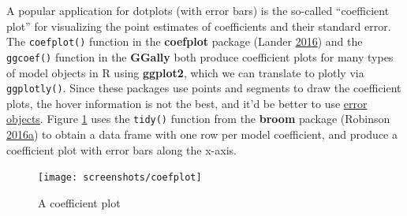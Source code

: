 \documentclass[12pt,]{isuthesis}
\newenvironment{Shaded}{\begin{snugshade}}{\end{snugshade}}
\newcommand{\KeywordTok}[1]{\textcolor[rgb]{0.13,0.29,0.53}{\textbf{{#1}}}}
\newcommand{\DataTypeTok}[1]{\textcolor[rgb]{0.13,0.29,0.53}{{#1}}}
\newcommand{\DecValTok}[1]{\textcolor[rgb]{0.00,0.00,0.81}{{#1}}}
\newcommand{\StringTok}[1]{\textcolor[rgb]{0.31,0.60,0.02}{{#1}}}
\newcommand{\CommentTok}[1]{\textcolor[rgb]{0.56,0.35,0.01}{\textit{{#1}}}}
\newcommand{\NormalTok}[1]{{#1}}
\begin{document}
A popular application for dotplots (with error bars) is the so-called
``coefficient plot'' for visualizing the point estimates of coefficients
and their standard error. The \texttt{coefplot()} function in the
\textbf{coefplot} package (Lander
\protect\hyperlink{ref-coefplot}{2016}) and the \texttt{ggcoef()}
function in the \textbf{GGally} both produce coefficient plots for many
types of model objects in R using \textbf{ggplot2}, which we can
translate to plotly via \texttt{ggplotly()}. Since these packages use
points and segments to draw the coefficient plots, the hover information
is not the best, and it'd be better to use
\href{https://plot.ly/r/reference/\#scatter-error_x}{error objects}.
Figure \ref{fig:coefplot} uses the \texttt{tidy()} function from the
\textbf{broom} package (Robinson
\protect\hyperlink{ref-broom}{2016}\protect\hyperlink{ref-broom}{a}) to
obtain a data frame with one row per model coefficient, and produce a
coefficient plot with error bars along the x-axis.

\begin{Shaded}
\end{Shaded}

\begin{figure}
\centering
\texttt{[image: screenshots/coefplot]}
\caption{\label{fig:coefplot}A coefficient plot}
\end{figure}
\end{document}
